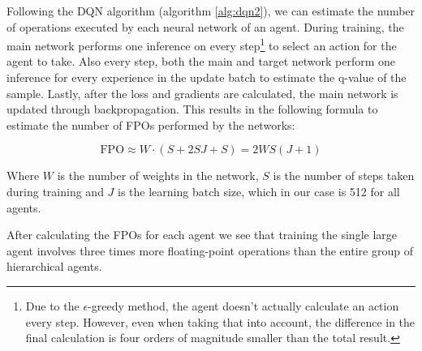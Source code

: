 Following the DQN algorithm (algorithm \ref{alg:dqn2}), we can estimate the number of operations executed by each neural network of an agent. During training, the main network performs one inference on every step\footnote{Due to the $\epsilon$-greedy method, the agent doesn't actually calculate an action every step. However, even when taking that into account, the difference in the final calculation is four orders of magnitude smaller than the total result.} to select an action for the agent to take. Also every step, both the main and target network perform one inference for every experience in the update batch to estimate the q-value of the sample. Lastly, after the loss and gradients are calculated, the main network is updated through backpropagation. This results in the following formula to estimate the number of FPOs performed by the networks:

\begin{equation}
    \mathrm{FPO} \approx W \cdot (S + 2SJ + S) = 2WS(J+1)
\end{equation}

Where $W$ is the number of weights in the network, $S$ is the number of steps taken during training and $J$ is the learning batch size, which in our case is 512 for all agents.

After calculating the FPOs for each agent we see that training the single large agent involves three times more floating-point operations than the entire group of hierarchical agents.